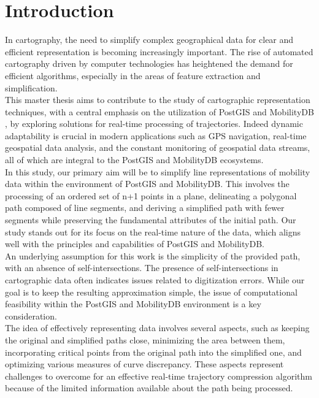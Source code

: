 
\chapter{Introduction}


In cartography, the need to simplify complex geographical data for clear and efficient representation is becoming increasingly important. The rise of automated cartography driven by computer technologies has heightened the demand for efficient algorithms, especially in the areas of feature extraction and simplification.\\


This master thesis aims to contribute to the study of cartographic representation techniques, with a central emphasis on the utilization of PostGIS and MobilityDB \cite{zimanyi2019MobilityDB}, by exploring solutions for real-time processing of trajectories. Indeed dynamic adaptability is crucial in modern applications such as GPS navigation, real-time geospatial data analysis, and the constant monitoring of geospatial data streams, all of which are integral to the PostGIS and MobilityDB ecosystems.\\



In this study, our primary aim will be to simplify line representations of mobility data within the environment of PostGIS and MobilityDB. This involves the processing of an ordered set of n+1 points in a plane, delineating a polygonal path composed of line segments, and deriving a simplified path with fewer segments while preserving the fundamental attributes of the initial path. Our study stands out for its focus on the real-time nature of the data, which aligns well with the principles and capabilities of PostGIS and MobilityDB.\\




An underlying assumption for this work is the simplicity of the provided path, with an absence of self-intersections. The presence of self-intersections in cartographic data often indicates issues related to digitization errors. While our goal is to keep the resulting approximation simple, the issue of computational feasibility within the PostGIS and MobilityDB environment is a key consideration.\\




The idea of effectively representing data involves several aspects, such as keeping the original and simplified paths close, minimizing the area between them, incorporating critical points from the original path into the simplified one, and optimizing various measures of curve discrepancy. These aspects represent challenges to overcome for an effective real-time trajectory compression algorithm because of the limited information available about the path being processed.\\




